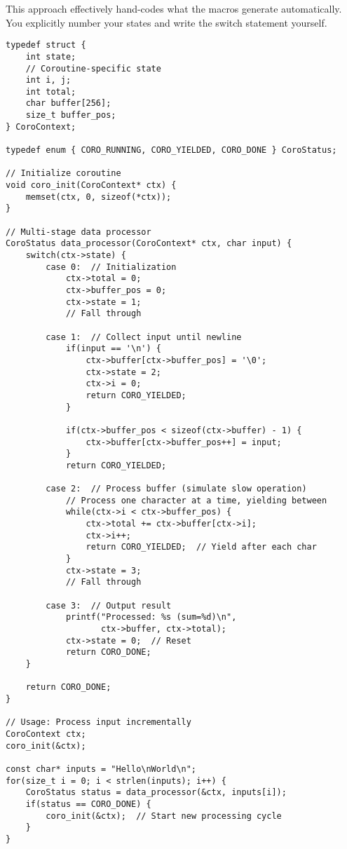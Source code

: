 This approach effectively hand-codes what the macros generate automatically. You explicitly number your states and write the switch statement yourself.

\begin{lstlisting}
typedef struct {
    int state;
    // Coroutine-specific state
    int i, j;
    int total;
    char buffer[256];
    size_t buffer_pos;
} CoroContext;

typedef enum { CORO_RUNNING, CORO_YIELDED, CORO_DONE } CoroStatus;

// Initialize coroutine
void coro_init(CoroContext* ctx) {
    memset(ctx, 0, sizeof(*ctx));
}

// Multi-stage data processor
CoroStatus data_processor(CoroContext* ctx, char input) {
    switch(ctx->state) {
        case 0:  // Initialization
            ctx->total = 0;
            ctx->buffer_pos = 0;
            ctx->state = 1;
            // Fall through

        case 1:  // Collect input until newline
            if(input == '\n') {
                ctx->buffer[ctx->buffer_pos] = '\0';
                ctx->state = 2;
                ctx->i = 0;
                return CORO_YIELDED;
            }

            if(ctx->buffer_pos < sizeof(ctx->buffer) - 1) {
                ctx->buffer[ctx->buffer_pos++] = input;
            }
            return CORO_YIELDED;

        case 2:  // Process buffer (simulate slow operation)
            // Process one character at a time, yielding between
            while(ctx->i < ctx->buffer_pos) {
                ctx->total += ctx->buffer[ctx->i];
                ctx->i++;
                return CORO_YIELDED;  // Yield after each char
            }
            ctx->state = 3;
            // Fall through

        case 3:  // Output result
            printf("Processed: %s (sum=%d)\n",
                   ctx->buffer, ctx->total);
            ctx->state = 0;  // Reset
            return CORO_DONE;
    }

    return CORO_DONE;
}

// Usage: Process input incrementally
CoroContext ctx;
coro_init(&ctx);

const char* inputs = "Hello\nWorld\n";
for(size_t i = 0; i < strlen(inputs); i++) {
    CoroStatus status = data_processor(&ctx, inputs[i]);
    if(status == CORO_DONE) {
        coro_init(&ctx);  // Start new processing cycle
    }
}
\end{lstlisting}

